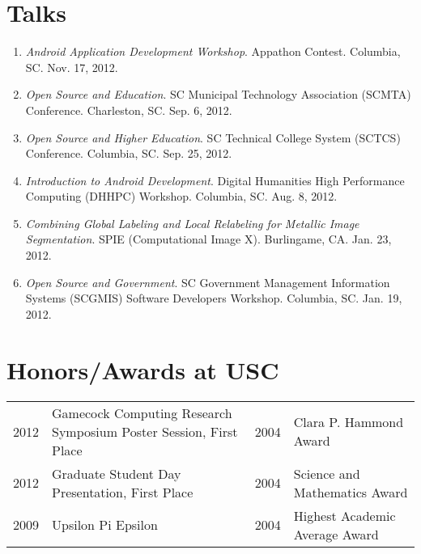 \documentclass[10pt]{article}
\begin{document}
\let\originalbibitem\bibitem
\def\bibitem#1#2\par{%
  \noexpandarg
  \originalbibitem{#1}
  \par}

\nocite{waggoner:13c}
\nocite{waggoner:11}
\nocite{wang:11}
\nocite{temlyakov:10}
\nocite{zhang:10}
\nocite{waggoner:12}
\nocite{barbu:12}
\nocite{zhang:12}

\renewcommand\refname{Selected Publications}
{\footnotesize }


\section{Talks}
{\small
\begin{enumerate}
\renewcommand{\labelenumi}{[P\arabic{enumi}] }
\item \emph{Android Application Development Workshop}.  Appathon
  Contest.  Columbia, SC.  Nov. 17, 2012. 
\item \emph{Open Source and Education}. SC Municipal Technology
  Association (SCMTA) Conference. Charleston, SC.  Sep. 6, 2012.
\item \emph{Open Source and Higher Education}.  SC Technical College
  System (SCTCS) Conference.  Columbia, SC.  Sep. 25, 2012.
\item \emph{Introduction to Android Development}.  Digital Humanities
  High Performance Computing (DHHPC) Workshop.  Columbia, SC.  Aug.
  8, 2012.
\item \emph{Combining Global Labeling and Local Relabeling for
  Metallic Image Segmentation}.  SPIE (Computational Image X).
  Burlingame, CA.  Jan. 23, 2012.
\item \emph{Open Source and Government}.  SC Government Management
  Information Systems (SCGMIS) Software Developers Workshop.
  Columbia, SC.  Jan. 19, 2012.
\end{enumerate} }

\section{Honors/Awards at USC}
\begin{tabularx}{\textwidth}{@{}r|X l|p{4.9cm}@{}}
2012 & \small{Gamecock Computing Research Symposium Poster Session,  First Place} &
2004 & Clara P. Hammond Award  \\

2012 & Graduate Student Day Presentation,  First Place &
2004 & Science and Mathematics Award \\

2009 & Upsilon Pi Epsilon &
2004 & Highest Academic Average Award \\
\end{tabularx}
\end{document}

